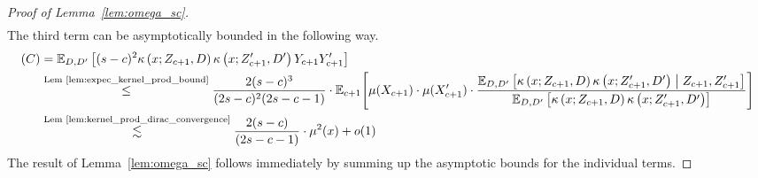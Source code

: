 \begin{proof}[Proof of Lemma~\ref{lem:omega_sc}]
\begin{equation}
\begin{aligned}
		\end{aligned}
	\end{equation}
	The third term can be asymptotically bounded in the following way.
	\begin{equation}
		\begin{aligned}
			(C)
            & = \mathbb{E}_{D, D^{\prime}}\left[(s-c)^2 \kappa\left(x; Z_{c+1}, D\right)\kappa\left(x; Z_{c+1}^{\prime}, D^{\prime}\right)Y_{c+1}Y_{c+1}^{\prime}\right]                                           \\
			& \overset{\text{Lem \ref{lem:expec_kernel_prod_bound}}}{\leq} \frac{2(s-c)^{3}}{(2s-c)^{2}(2s-c-1)}
            \cdot \mathbb{E}_{c+1}\Bigg[
                \mu(X_{c+1}) \cdot \mu(X_{c+1}^{\prime}) \cdot \frac{\mathbb{E}_{D, D^{\prime}}\left[\kappa\left(x; Z_{c+1}, D\right)\kappa\left(x; Z_{c+1}^{\prime}, D^{\prime}\right) \; \middle| \; Z_{c+1}, Z_{c+1}^{\prime}\right]}{\mathbb{E}_{D, D^{\prime}}\left[\kappa\left(x; Z_{c+1}, D\right)\kappa\left(x; Z_{c+1}^{\prime}, D^{\prime}\right)\right]}
            \Bigg]\\
			& \overset{\text{Lem \ref{lem:kernel_prod_dirac_convergence}}}{\lesssim}
            \frac{2(s-c)}{(2s-c-1)} \cdot \mu^2(x) + o(1)
		\end{aligned}
	\end{equation}
	The result of Lemma~\ref{lem:omega_sc} follows immediately by summing up the asymptotic bounds for the individual terms.
\end{proof}

